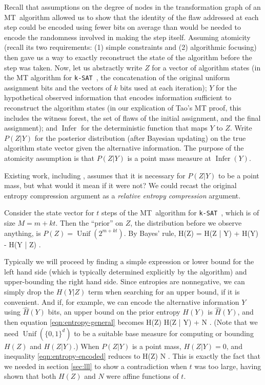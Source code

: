 \documentclass{article}
\newcommand{\ksat}{\texttt{k-SAT}~}
\newcommand{\mt}{MT~}
\def\seqn#1\eeqn{\begin{align}#1\end{align}}
\begin{document}
Recall that assumptions on the degree of nodes in the transformation graph of an \mt algorithm allowed us to show that the identity of the flaw addressed at each step could be encoded using fewer bits on average than would be needed to encode the randomness involved in making the step itself.  Assuming atomicity (recall its two requirements: (1) simple constraints and (2) algorithmic focusing) then gave us a way to exactly reconstruct the state of the algorithm before the step was taken.  Now, let us abstractly write $Z$ for a vector of algorithm states (in the MT algorithm for \ksat, the concatenation of the original uniform assignment bits and the vectors of $k$ bits used at each iteration); $Y$ for the hypothetical observed information that encodes information sufficient to reconstruct the algorithm states (in our explication of Tao's MT proof, this includes the witness forest, the set of flaws of the initial assignment, and the final assignment); and $\operatorname{Infer}$ for the deterministic function that maps $Y$ to $Z$.  Write $P(Z | Y)$ for the posterior distribution (after Bayesian updating) on the true algorithm state vector given the alternative information.  The purpose of the atomicity assumption is that $P(Z | Y)$ is a point mass measure at $\operatorname{Infer}(Y)$.

Existing work, including \cite{achlioptas2014random}, assumes that it is necessary for $P(Z | Y)$ to be a point mass, but what would it mean if it were not?  We could recast the original entropy compression argument as a \emph{relative entropy compression} argument.

Consider the state vector for $t$ steps of the \mt algorithm for \ksat, which is of size $M = m + kt$.  Then the ``prior'' on $Z$, the distribution before we observe anything, is $P(Z) = \operatorname{Unif}(2^{m+kt})$.  By Bayes' rule, 
\seqn
  \label{eqn:entropy-general}
  H(Z) = H(Z | Y) + H(Y) - H(Y | Z) .
\eeqn

Typically we will proceed by finding a simple expression or lower bound for the left hand side (which is typically determined explicitly by the algorithm) and upper-bounding the right hand side.  Since entropies are nonnegative, we can simply drop the $H(Y | Z)$ term when searching for an upper bound, if it is convenient.  And if, for example, we can encode the alternative information $Y$ using $\hat{H}(Y)$ bits, an upper bound on the prior entropy $H(Y)$ is $\hat{H}(Y)$, and then equation \ref{eqn:entropy-general} becomes
\seqn
  \label{eqn:entropy-encoded}
  H(Z) \leq H(Z | Y) + N .
\eeqn
(Note that we need $\operatorname{Unif}(\{0,1\}^d)$ to be a suitable base measure for computing or bounding $H(Z)$ and $H(Z | Y)$.)  When $P(Z | Y)$ is a point mass, $H(Z | Y) = 0$, and inequality \ref{eqn:entropy-encoded} reduces to
\seqn
  \label{eqn:entropy-tao}
  H(Z) \leq N .
\eeqn
This is exactly the fact that we needed in section \ref{sec:lll} to show a contradiction when $t$ was too large, having shown that both $H(Z)$ and $N$ were affine functions of $t$.
\end{document}
